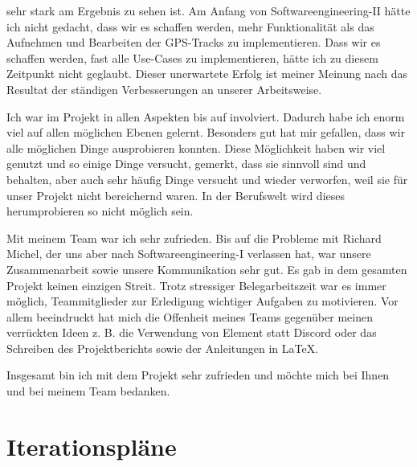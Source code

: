 \documentclass[10pt]{article}
\begin{document}
sehr stark am Ergebnis zu sehen ist. Am Anfang von Softwareengineering-II hätte ich nicht gedacht, dass wir es
schaffen werden, mehr Funktionalität als das Aufnehmen und Bearbeiten der GPS-Tracks zu implementieren.
Dass wir es schaffen werden, fast alle Use-Cases zu implementieren, hätte ich zu diesem Zeitpunkt nicht geglaubt.
Dieser unerwartete Erfolg ist meiner Meinung nach das Resultat der ständigen Verbesserungen an unserer Arbeitsweise.\par
\medskip
Ich war im Projekt in allen Aspekten bis auf  involviert.
Dadurch habe ich enorm viel auf allen möglichen Ebenen gelernt. Besonders gut hat mir gefallen, dass wir
alle möglichen Dinge ausprobieren konnten. Diese Möglichkeit haben wir viel genutzt und so einige Dinge versucht,
gemerkt, dass sie sinnvoll sind und behalten, aber auch sehr häufig Dinge versucht und wieder verworfen, weil sie für
unser Projekt nicht bereichernd waren.
In der Berufswelt wird dieses herumprobieren so nicht möglich sein.\par
\medskip
Mit meinem Team war ich sehr zufrieden. Bis auf die Probleme mit Richard Michel, der uns aber nach Softwareengineering-I
verlassen hat, war unsere Zusammenarbeit sowie unsere Kommunikation sehr gut. Es gab in dem gesamten Projekt keinen
einzigen Streit. Trotz stressiger Belegarbeitszeit war es
immer möglich, Teammitglieder zur Erledigung wichtiger Aufgaben zu motivieren. Vor allem beeindruckt hat mich die
Offenheit meines Teams gegenüber meinen verrückten Ideen z. B. die Verwendung von Element statt Discord oder
das Schreiben des Projektberichts sowie der Anleitungen in LaTeX.\par 
\medskip 
Insgesamt bin ich mit dem Projekt sehr zufrieden und möchte mich bei Ihnen und bei meinem Team bedanken.
\newpage

\appendix
\section{Iterationspläne}

\end{document}
